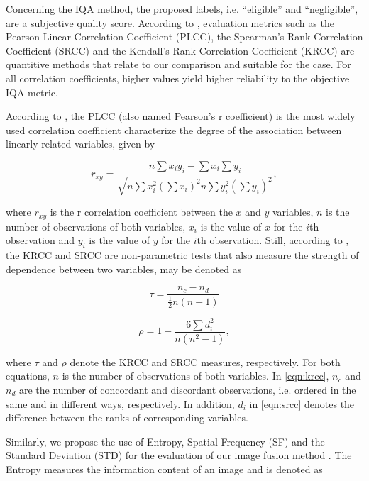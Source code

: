 Concerning the IQA method, the proposed labels, i.e. ``eligible'' and ``negligible'', are a subjective quality score. According to , evaluation metrics such as the Pearson Linear Correlation Coefficient (PLCC), the Spearman's Rank Correlation Coefficient (SRCC) and the Kendall's Rank Correlation Coefficient (KRCC) are quantitive methods that relate to our comparison and suitable for the case. For all correlation coefficients, higher values yield higher reliability to the objective IQA metric.

According to , the PLCC (also named Pearson's r coefficient) is the most widely used correlation coefficient characterize the degree of the association between linearly related variables, given by

\begin{equation}
\label{eqn:plcc}
r_{xy} = \frac{n \sum x_{i} y_{i} - \sum x_{i} \sum y_{i}}{\sqrt{n \sum x_{i}^{2} \left(\sum x_{i}\right)^{2} n \sum y_{i}^{2} \left(\sum y_{i}\right)^{2}}},
\end{equation}

\noindent where $r_{xy}$ is the r correlation coefficient between the $x$ and $y$ variables, $n$ is the number of observations of both variables, $x_{i}$ is the value of $x$ for the $i$th observation and $y_{i}$ is the value of $y$ for the $i$th observation. Still, according to , the KRCC and SRCC are non-parametric tests that also measure the strength of dependence between two variables, may be denoted as

\begin{equation}
\label{eqn:krcc}
\tau = \frac{n_{c} - n_{d}}{\frac{1}{2} n \left(n-1 \right)}
\end{equation}

\begin{equation}
\label{eqn:srcc}
\rho = 1 - \frac{6 \sum d_{i}^{2}}{n \left(n^{2}-1 \right)},
\end{equation}

\noindent where $\tau$ and $\rho$ denote the KRCC and SRCC measures, respectively. For both equations, $n$ is the number of observations of both variables. In \autoref{eqn:krcc}, $n_{c}$ and $n_{d}$ are the number of concordant and discordant observations, i.e. ordered in the same and in different ways, respectively. In addition, $d_{i}$ in \autoref{eqn:srcc} denotes the difference between the ranks of corresponding variables.

Similarly, we propose the use of Entropy, Spatial Frequency (SF) and the Standard Deviation (STD) for the evaluation of our image fusion method \cite{naidu2008pixel}. The Entropy measures the information content of an image and is denoted as

